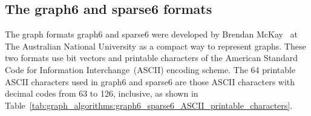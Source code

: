 
\subsection{The graph6 and sparse6 formats}

The graph formats graph6 and sparse6 were developed by Brendan
McKay~\cite{McKay2010} at The Australian National University as a
compact way to represent graphs. These two formats use bit vectors and
printable characters of the American Standard Code for Information
Interchange~(ASCII) encoding scheme. The 64 printable ASCII characters
used in graph6 and sparse6 are those ASCII characters with decimal
codes from 63 to 126, inclusive, as shown in
Table~\ref{tab:graph_algorithms:graph6_sparse6_ASCII_printable_characters}.

